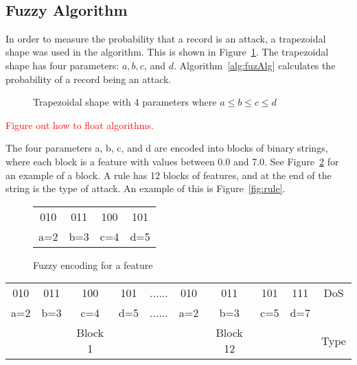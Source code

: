 \documentclass{sig-alternate}
\newcommand{\mycomment}[1]{\textcolor{red}{#1}}
\begin{document}
~\cite{KDD99}




\subsection{Fuzzy Algorithm}
In order to measure the probability that a record is an attack, a trapezoidal shape was used in the algorithm. This is shown in Figure~\ref{fig:trapFigure}. The trapezoidal shape has four parameters: $a, b, c$, and $d$. Algorithm~\ref{alg:fuzAlg} calculates the probability of a record being an attack.

\begin{figure}
\centering
{}
\caption{Trapezoidal shape with 4 parameters where $a\leq b\leq c\leq d$}
\label{fig:trapFigure}
\end{figure}

\mycomment{Figure out how to float algorithms.}
\begin{algorithm}
\caption{Fuzzy Algorithm}
\label{alg:fuzAlg}
\begin{algorithmic}
\ELSE {}
\ENDIF
\end{algorithmic}
\end{algorithm}

The four parameters a, b, c, and d are encoded into blocks of binary strings, where each block is a feature with values between 0.0 and 7.0. See Figure~\ref{fig:fuzEncodingForFeature} for an example of a block. A rule has 12 blocks of features, and at the end of the string is the type of attack. An example of this is Figure~\ref{fig:rule}.

\begin{figure}
\centering
\caption{Fuzzy encoding for a feature}
\begin{tabular}{|cccc|} \hline
010 & 011 & 100 & 101\\
a=2 & b=3 & c=4 & d=5\\
\hline\end{tabular}
\label{fig:fuzEncodingForFeature}
\end{figure}

\begin{figure*}
\centering
\caption{A rule with 12 blocks of features}
\begin{tabular}{|cccc|c|cccc|c|} \hline
010 & 011 & 100 & 101   & ...... & 010 & 011 & 101 & 111   & DoS\\
a=2 & b=3 & c=4 & d=5   & ...... & a=2 & b=3 & c=5 & d=7   &\\ 
    &     & Block 1&    &        &     & Block 12& &       & Type\\
\hline\end{tabular}
\label{fig:rule}
\end{figure*}
\end{document}
